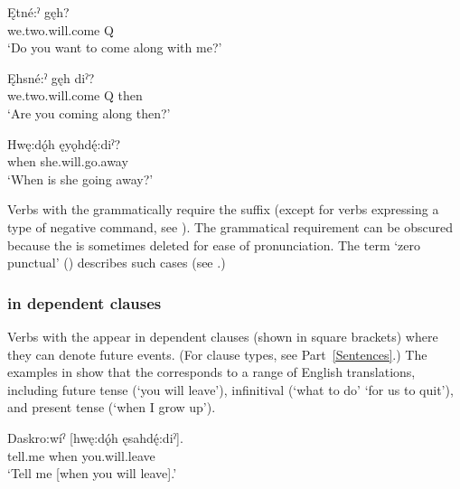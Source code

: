 \ex\label{ex:moodex100d}
\gll Ętné:ˀ gęh? \\
we.two.will.come Q \\
\glt ‘Do you want to come along with me?’ 

\ex\label{ex:moodex100e}
\gll Ęhsné:ˀ gęh diˀ? \\
we.two.will.come Q then \\
\glt ‘Are you coming along then?’ 

\ex\label{ex:moodex100f}
\gll Hwę:dǫ́h ęyǫhdę́:diˀ? \\
when she.will.go.away\\
\glt ‘When is she going away?’
\z
\z


Verbs with the  {\future} grammatically require the  {\punctual} suffix (except for verbs expressing a type of negative command, see ). The grammatical requirement can be obscured because the  {\punctual} is sometimes deleted for ease of pronunciation. The term ‘zero punctual' (\textsc{\zeropunctual}) describes such cases (see .)


\subsubsection*{ {\future} in dependent clauses} \label{[ę-] future in dependent clauses}
Verbs with the  {\future} appear in dependent clauses (shown in square brackets) where they can denote future events. (For clause types, see Part~\ref{Sentences}.) The examples in  show that the  {\future} corresponds to a range of English translations, including future tense (‘you will leave’), infinitival (‘what to do’ ‘for us to quit’), and present tense (‘when I grow up’).

\ea\label{ex:futureex20} 
\ea
\gll Daskro:wíˀ [hwę:dǫ́h ęsahdę́:diˀ]. \\
tell.me when you.will.leave \\
\glt ‘Tell me [when you will leave].’ 

